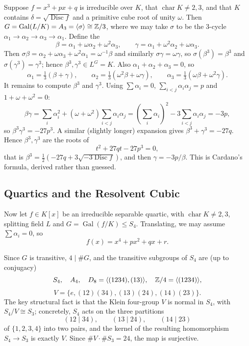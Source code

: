\documentclass[a4paper]{scrartcl}
\newcommand{\charr}{\operatorname{char}}
\newcommand{\Gal}{\operatorname{Gal}}
\newcommand{\Disc}{\operatorname{Disc}}
\begin{document}
\begin{example}\label{ex:cubicresolvent}
	Suppose $f = x^3+px+q$ is irreducible over $K$, that $\charr K \neq 2,3$, and that $K$ contains $\delta = \sqrt{\Disc f}$ and a primitive cube root of unity $\omega$. Then $G = \Gal(L/K) = A_3 = \langle\sigma\rangle \cong \Z/3$, where we may take $\sigma$ to be the $3$-cycle $\alpha_1 \to \alpha_2 \to \alpha_3 \to \alpha_1$. Define the 
	$$\beta = \alpha_1 + \omega\alpha_2+\omega^2\alpha_3, \qquad \gamma = \alpha_1+\omega^2\alpha_2+\omega\alpha_3.$$
	Then $\sigma\beta = \alpha_2 + \omega\alpha_3 + \omega^2\alpha_1 = \omega^{-1}\beta$ and similarly $\sigma\gamma = \omega\gamma$, so $\sigma(\beta^3) = \beta^3$ and $\sigma(\gamma^3) = \gamma^3$; hence $\beta^3, \gamma^3 \in L^G = K$. Also $\alpha_1+\alpha_2+\alpha_3 = 0$, so
	$$\alpha_1 = \tfrac13(\beta+\gamma), \qquad \alpha_2 = \tfrac13(\omega^2\beta+\omega\gamma), \qquad \alpha_3 = \tfrac13(\omega\beta+\omega^2\gamma).$$
	It remains to compute $\beta^3$ and $\gamma^3$. Using $\sum\alpha_i = 0$, $\sum_{i<j}\alpha_i\alpha_j = p$ and $1 + \omega + \omega^2 = 0$:
	$$\beta\gamma = \sum_i \alpha_i^2 + (\omega+\omega^2)\sum_{i<j}\alpha_i\alpha_j = \left(\sum_i\alpha_i\right)^2 - 3\sum_{i<j}\alpha_i\alpha_j = -3p,$$
	so $\beta^3\gamma^3 = -27p^3$. A similar (slightly longer) expansion gives $\beta^3 + \gamma^3 = -27q$. Hence $\beta^3, \gamma^3$ are the roots of
	$$t^2 + 27qt - 27p^3 = 0,$$
	that is $\beta^3 = \tfrac12(-27q + 3\sqrt{-3\Disc f})$, and then $\gamma = -3p/\beta$. This is Cardano's formula, derived rather than guessed.
\end{example}

\subsection{Quartics and the Resolvent Cubic}

Now let $f \in K[x]$ be an irreducible separable quartic, with $\charr K \neq 2,3$, splitting field $L$ and $G = \Gal(f/K) \leq S_4$. Translating, we may assume $\sum\alpha_i = 0$, so
$$f(x) = x^4 + px^2 + qx + r.$$

Since $G$ is transitive, $4 \mid \#G$, and the transitive subgroups of $S_4$ are (up to conjugacy)
$$S_4, \quad A_4, \quad D_8 = \langle (1234), (13)\rangle, \quad \mathbb{Z}/4 = \langle(1234)\rangle,$$
$$V = \{e,(12)(34),(13)(24),(14)(23)\}.$$
The key structural fact is that the Klein four-group $V$ is normal in $S_4$, with $S_4/V \cong S_3$; concretely, $S_4$ acts on the three partitions
$$(12\mid34), \qquad (13\mid24), \qquad (14\mid23)$$
of $\{1,2,3,4\}$ into two pairs, and the kernel of the resulting homomorphism $S_4 \to S_3$ is exactly $V$. Since $\#V \cdot \#S_3 = 24$, the map is surjective.
\end{document}
